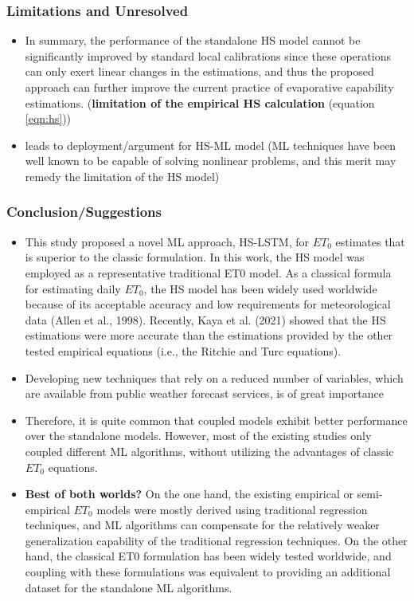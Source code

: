 \documentclass[paper=a4, fontsize=12pt]{scrartcl}
\begin{document}
	\subsubsection*{Limitations and Unresolved}
	\begin{itemize}
		\item In summary, the performance of the standalone HS model cannot be significantly improved by standard local calibrations since these operations can only exert linear changes in the estimations, and thus the proposed approach can further improve the current practice of evaporative capability estimations. (\textbf{limitation of the empirical HS calculation} (equation \ref{eqn:hs}))
		\item leads to deployment/argument for HS-ML model (ML techniques have been well known to be capable of solving nonlinear problems, and this merit may remedy the limitation of the HS model)
	\end{itemize}
	
	
	\subsubsection*{Conclusion/Suggestions}
	\begin{itemize}
		\item  This study proposed a novel ML approach, HS-LSTM, for $ET_0$ estimates that is superior to the classic formulation. In this work, the HS model was employed as a representative traditional ET0 model. As a classical formula for estimating daily $ET_0$, the HS model has been widely used worldwide because of its acceptable accuracy and low requirements for meteorological data (Allen et al., 1998). Recently, Kaya et al. (2021) showed that the HS estimations were more accurate than the estimations provided by the other tested empirical equations (i.e., the Ritchie and Turc equations).
		\item Developing new techniques that rely on a reduced number of variables, which are available from public weather forecast services, is of great importance
		\item Therefore, it is quite common that coupled models exhibit better performance over the standalone models. However, most of the existing studies only coupled different ML algorithms, without utilizing the advantages of classic $ET_0$ equations.
		\item \textbf{Best of both worlds?} On the one hand, the existing empirical or semi-empirical $ET_0$ models were mostly derived using traditional regression techniques, and ML algorithms can compensate for the relatively weaker generalization capability of the traditional regression techniques. On the other hand, the classical ET0 formulation has been widely tested worldwide, and coupling with these formulations was equivalent to providing an additional dataset for the standalone ML algorithms.
	\end{itemize}
	
\end{document}
